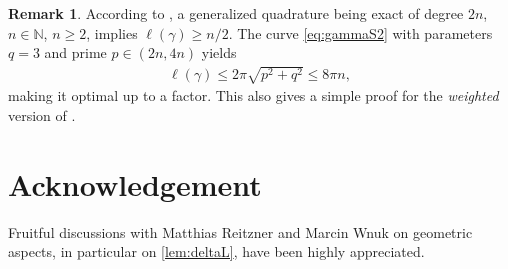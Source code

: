 \documentclass[11pt,a4paper,twoside,final,biblatex]{scrartcl}
\newcommand{\N}{\ensuremath{\mathbb{N}}}
\theoremstyle{definition}
\newtheorem{remark}[theorem]{Remark}
\numberwithin{equation}{section}
\numberwithin{table}{section}
\numberwithin{figure}{section}
\begin{document}
\begin{remark}
 According to \cite[Thm.~5.1 and Cor.~5.2]{EhGr26}, a generalized quadrature being exact of degree $2n$, $n\in\N$, $n\ge 2$, implies $\ell(\gamma)\ge n/2$.
 The curve \eqref{eq:gammaS2} with parameters $q=3$ and prime $p\in (2n,4n)$ yields
 \begin{align*}
     \ell(\gamma)\le 2\pi\sqrt{p^2+q^2}\le 8\pi n,
 \end{align*}
 making it optimal up to a factor. This also gives a simple proof for the \emph{weighted} version of \cite[Thm.~1.2]{EhGr23}.
\end{remark}

\section*{Acknowledgement}
Fruitful discussions with Matthias Reitzner and Marcin Wnuk on geometric aspects, in particular on \cref{lem:deltaL}, have been highly appreciated.

%


\end{document}

